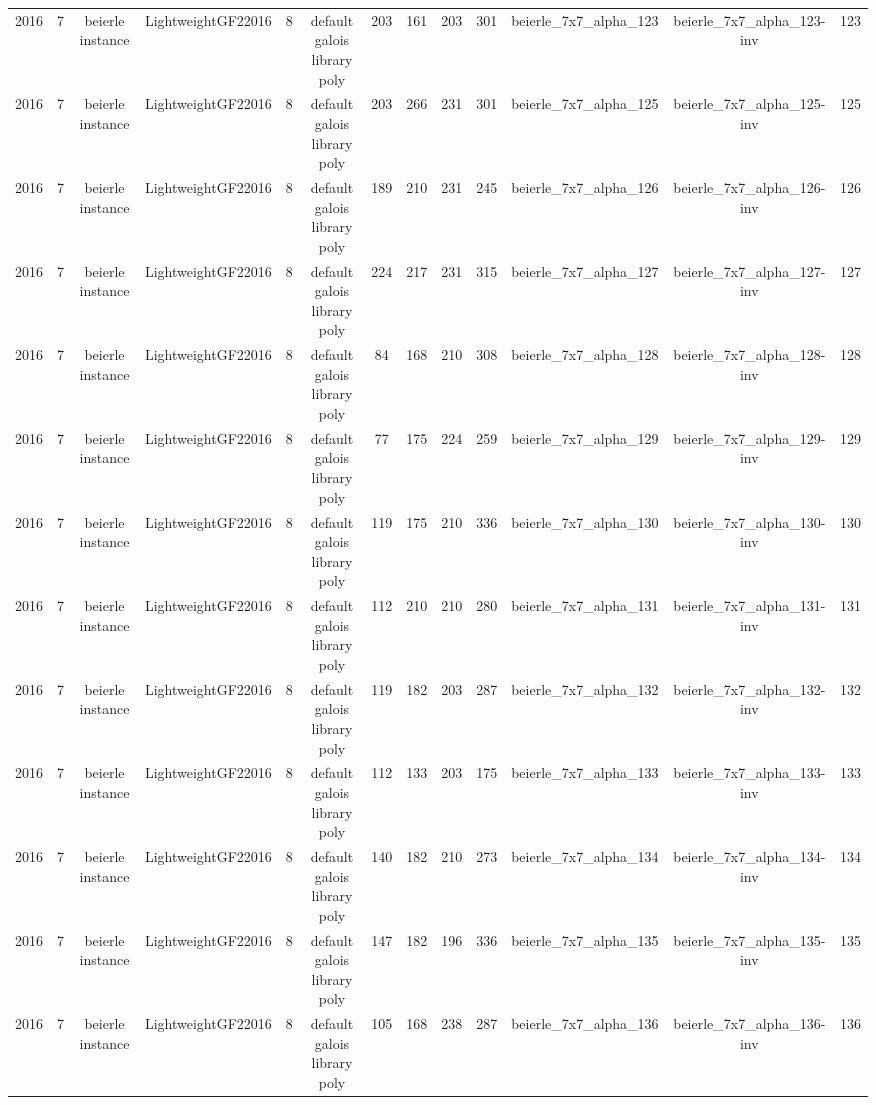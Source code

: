 \begin{tabular}{c c c c c c c c c c c c c}
2016 & 7 & beierle instance & LightweightGF22016 & 8 & default galois library poly & 203 & 161 & 203 & 301 & beierle_7x7_alpha_123 & beierle_7x7_alpha_123-inv & 123 \\
2016 & 7 & beierle instance & LightweightGF22016 & 8 & default galois library poly & 203 & 266 & 231 & 301 & beierle_7x7_alpha_125 & beierle_7x7_alpha_125-inv & 125 \\
2016 & 7 & beierle instance & LightweightGF22016 & 8 & default galois library poly & 189 & 210 & 231 & 245 & beierle_7x7_alpha_126 & beierle_7x7_alpha_126-inv & 126 \\
2016 & 7 & beierle instance & LightweightGF22016 & 8 & default galois library poly & 224 & 217 & 231 & 315 & beierle_7x7_alpha_127 & beierle_7x7_alpha_127-inv & 127 \\
2016 & 7 & beierle instance & LightweightGF22016 & 8 & default galois library poly & 84 & 168 & 210 & 308 & beierle_7x7_alpha_128 & beierle_7x7_alpha_128-inv & 128 \\
2016 & 7 & beierle instance & LightweightGF22016 & 8 & default galois library poly & 77 & 175 & 224 & 259 & beierle_7x7_alpha_129 & beierle_7x7_alpha_129-inv & 129 \\
2016 & 7 & beierle instance & LightweightGF22016 & 8 & default galois library poly & 119 & 175 & 210 & 336 & beierle_7x7_alpha_130 & beierle_7x7_alpha_130-inv & 130 \\
2016 & 7 & beierle instance & LightweightGF22016 & 8 & default galois library poly & 112 & 210 & 210 & 280 & beierle_7x7_alpha_131 & beierle_7x7_alpha_131-inv & 131 \\
2016 & 7 & beierle instance & LightweightGF22016 & 8 & default galois library poly & 119 & 182 & 203 & 287 & beierle_7x7_alpha_132 & beierle_7x7_alpha_132-inv & 132 \\
2016 & 7 & beierle instance & LightweightGF22016 & 8 & default galois library poly & 112 & 133 & 203 & 175 & beierle_7x7_alpha_133 & beierle_7x7_alpha_133-inv & 133 \\
2016 & 7 & beierle instance & LightweightGF22016 & 8 & default galois library poly & 140 & 182 & 210 & 273 & beierle_7x7_alpha_134 & beierle_7x7_alpha_134-inv & 134 \\
2016 & 7 & beierle instance & LightweightGF22016 & 8 & default galois library poly & 147 & 182 & 196 & 336 & beierle_7x7_alpha_135 & beierle_7x7_alpha_135-inv & 135 \\
2016 & 7 & beierle instance & LightweightGF22016 & 8 & default galois library poly & 105 & 168 & 238 & 287 & beierle_7x7_alpha_136 & beierle_7x7_alpha_136-inv & 136 \\

\end{tabular}
